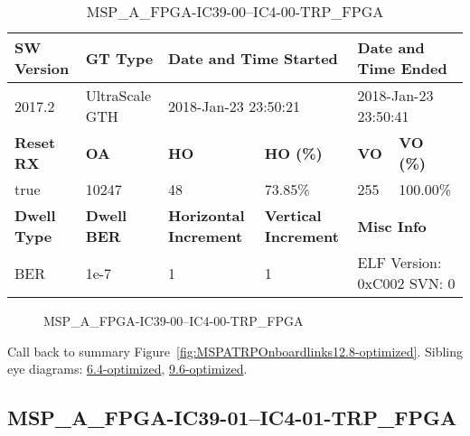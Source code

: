 \begin{table}[h]
\centering
\caption{MSP\_A\_FPGA-IC39-00--IC4-00-TRP\_FPGA}
\label{tab:MSPAFPGAIC3900IC400TRPFPGA12.8-optimized}
\begin{tabular}{@{}|l|l|l|l|l|l|@{}}
\toprule
\textbf{SW Version}                & \textbf{GT Type}   & \multicolumn{2}{l|}{\textbf{Date and Time Started}}            & \multicolumn{2}{l|}{\textbf{Date and Time Ended}}        \\ \midrule
2017.2                       & UltraScale GTH          & \multicolumn{2}{l|}{2018-Jan-23 23:50:21}                   & \multicolumn{2}{l|}{2018-Jan-23 23:50:41}               \\ \midrule
\textbf{Reset RX}                  & \textbf{OA} & \textbf{HO}   & \textbf{HO (\%)} & \textbf{VO} & \textbf{VO (\%)} \\ \midrule
true & 10247        & 48          & 73.85\%        & 255        & 100.00\%       \\ \midrule
\textbf{Dwell Type}                & \textbf{Dwell BER} & \textbf{Horizontal Increment} & \textbf{Vertical Increment}    & \multicolumn{2}{l|}{\textbf{Misc Info}}                  \\ \midrule
BER                            & 1e-7        & 1        & 1           & \multicolumn{2}{l|}{ELF Version: 0xC002 SVN: 0}                         \\ \bottomrule
\end{tabular}
\end{table}

\begin{figure}[h]
\caption{MSP\_A\_FPGA-IC39-00--IC4-00-TRP\_FPGA} \label{fig:MSPAFPGAIC3900IC400TRPFPGA12.8-optimized}
\end{figure}

Call back to summary Figure~\ref{fig:MSPATRPOnboardlinks12.8-optimized}.
Sibling eye diagrams: \hyperref[sec:MSPAFPGAIC3900IC400TRPFPGA6.4-optimized]{6.4-optimized}, \hyperref[sec:MSPAFPGAIC3900IC400TRPFPGA9.6-optimized]{9.6-optimized}.

\clearpage
\newpage


\subsection{MSP\_A\_FPGA-IC39-01--IC4-01-TRP\_FPGA}\label{sec:MSPAFPGAIC3901IC401TRPFPGA12.8-optimized}

